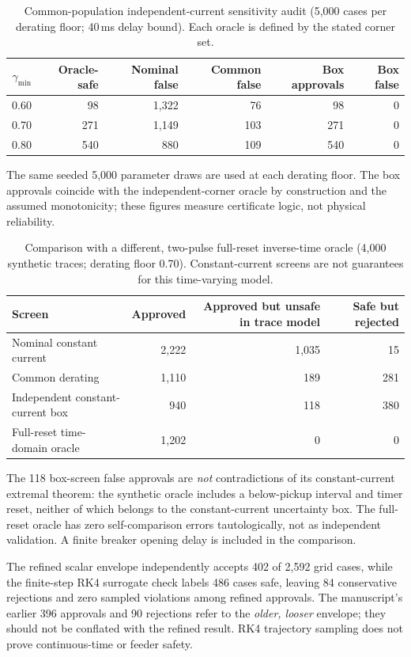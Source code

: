 \begin{table}[H]\centering
\caption{Common-population independent-current sensitivity audit (5,000 cases per derating floor; 40\,ms delay bound). Each oracle is defined by the stated corner set.}
\label{tab:sensitivity-audit}
\begin{tabular}{rrrrrr}\toprule
$\gamma_{\min}$ & Oracle-safe & Nominal false & Common false & Box approvals & Box false\\\midrule
0.60 & 98 & 1,322 & 76 & 98 & 0\\
0.70 & 271 & 1,149 & 103 & 271 & 0\\
0.80 & 540 & 880 & 109 & 540 & 0\\\bottomrule
\end{tabular}
\end{table}
The same seeded 5,000 parameter draws are used at each derating floor. The box approvals coincide with the independent-corner oracle by construction and the assumed monotonicity; these figures measure certificate logic, not physical reliability.

\begin{table}[H]\centering
\caption{Comparison with a different, two-pulse full-reset inverse-time oracle (4,000 synthetic traces; derating floor 0.70). Constant-current screens are not guarantees for this time-varying model.}
\label{tab:time-domain-audit}
\begin{tabular}{lrrr}\toprule
Screen & Approved & Approved but unsafe in trace model & Safe but rejected\\\midrule
Nominal constant current & 2,222 & 1,035 & 15\\
Common derating & 1,110 & 189 & 281\\
Independent constant-current box & 940 & 118 & 380\\
Full-reset time-domain oracle & 1,202 & 0 & 0\\\bottomrule
\end{tabular}
\end{table}
The 118 box-screen false approvals are \emph{not} contradictions of its constant-current extremal theorem: the synthetic oracle includes a below-pickup interval and timer reset, neither of which belongs to the constant-current uncertainty box. The full-reset oracle has zero self-comparison errors tautologically, not as independent validation. A finite breaker opening delay is included in the comparison.

The refined scalar envelope independently accepts 402 of 2,592 grid cases, while the finite-step RK4 surrogate check labels 486 cases safe, leaving 84 conservative rejections and zero sampled violations among refined approvals. The manuscript's earlier 396 approvals and 90 rejections refer to the \emph{older, looser} envelope; they should not be conflated with the refined result. RK4 trajectory sampling does not prove continuous-time or feeder safety.


